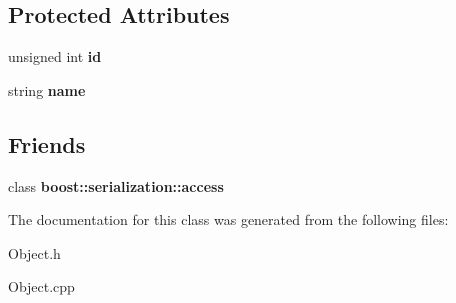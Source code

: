 \subsection*{Protected Attributes}
\begin{DoxyCompactItemize}
\item 
\hypertarget{class_object_a45e76e41e7fa83161a09c5694088a3bf}{
unsigned int {\bfseries id}}
\label{class_object_a45e76e41e7fa83161a09c5694088a3bf}

\item 
\hypertarget{class_object_af849c7778ff8399ac4440062ac5a38a3}{
string {\bfseries name}}
\label{class_object_af849c7778ff8399ac4440062ac5a38a3}

\end{DoxyCompactItemize}
\subsection*{Friends}
\begin{DoxyCompactItemize}
\item 
\hypertarget{class_object_ac98d07dd8f7b70e16ccb9a01abf56b9c}{
class {\bfseries boost::serialization::access}}
\label{class_object_ac98d07dd8f7b70e16ccb9a01abf56b9c}

\end{DoxyCompactItemize}


The documentation for this class was generated from the following files:\begin{DoxyCompactItemize}
\item 
Object.h\item 
Object.cpp\end{DoxyCompactItemize}
